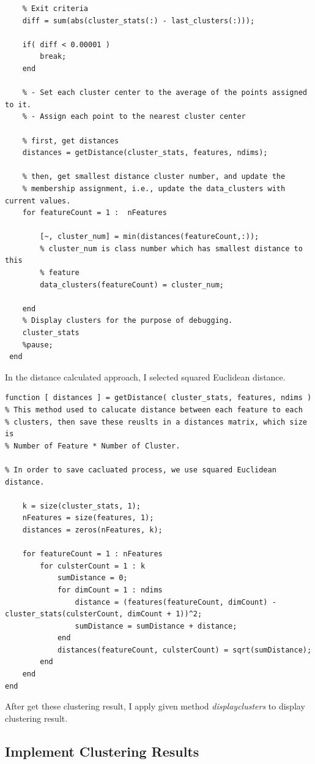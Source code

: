 \documentclass[12pt]{article}
\begin{document}
\begin{lstlisting}
    % Exit criteria
    diff = sum(abs(cluster_stats(:) - last_clusters(:)));
    
    if( diff < 0.00001 )
        break;
    end
    
    % - Set each cluster center to the average of the points assigned to it.
    % - Assign each point to the nearest cluster center  
 
    % first, get distances
    distances = getDistance(cluster_stats, features, ndims);
    
    % then, get smallest distance cluster number, and update the 
    % membership assignment, i.e., update the data_clusters with current values.  
    for featureCount = 1 : 	nFeatures
            
        [~, cluster_num] = min(distances(featureCount,:));
        % cluster_num is class number which has smallest distance to this
        % feature
        data_clusters(featureCount) = cluster_num;
        
    end
    % Display clusters for the purpose of debugging.  
    cluster_stats
    %pause;
 end 
\end{lstlisting}

In the distance calculated approach, I selected squared Euclidean distance. 
\begin{lstlisting}
function [ distances ] = getDistance( cluster_stats, features, ndims )
% This method used to calucate distance between each feature to each
% clusters, then save these reuslts in a distances matrix, which size is
% Number of Feature * Number of Cluster.

% In order to save cacluated process, we use squared Euclidean distance.
    
    k = size(cluster_stats, 1);
    nFeatures = size(features, 1);
    distances = zeros(nFeatures, k);
    
    for featureCount = 1 : nFeatures
        for culsterCount = 1 : k    
            sumDistance = 0;
            for dimCount = 1 : ndims       
                distance = (features(featureCount, dimCount) - cluster_stats(culsterCount, dimCount + 1))^2;
                sumDistance = sumDistance + distance;           
            end
            distances(featureCount, culsterCount) = sqrt(sumDistance);
        end
    end
end
\end{lstlisting}

After get these clustering result, I apply given method \textit{displayclusters} to display clustering result.

\subsection{Implement Clustering Results}
\end{document}
